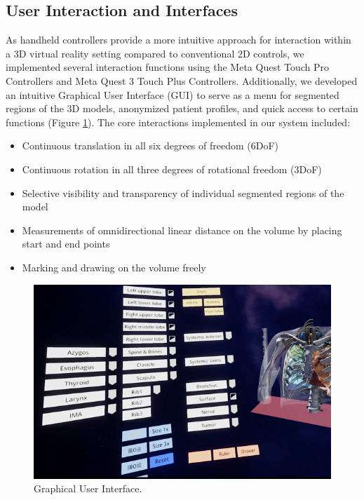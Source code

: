 \documentclass{bmcart}
\begin{document}
\subsection{User Interaction and Interfaces}
As handheld controllers provide a more intuitive approach for interaction within a 3D virtual reality setting compared to conventional 2D controls, we implemented several interaction functions using the Meta Quest Touch Pro Controllers and Meta Quest 3 Touch Plus Controllers. Additionally, we developed an intuitive Graphical User Interface (GUI) to serve as a menu for segmented regions of the 3D models, anonymized patient profiles, and quick access to certain functions (Figure \ref{fig:GUI}). The core interactions implemented in our system included:
\begin{itemize}
  \item Continuous translation in all six degrees of freedom (6DoF)
  \item Continuous rotation in all three degrees of rotational freedom (3DoF)
  \item Selective visibility and transparency of individual segmented regions of the model
  \item Measurements of omnidirectional linear distance on the volume by placing start and end points
  \item Marking and drawing on the volume freely
\end{itemize}
\begin{figure}
  \centering
  \includegraphics[width=.9\linewidth]{../Media/GUI}  
  \caption{Graphical User Interface.}
  \label{fig:GUI}
\end{figure}
\end{document}
